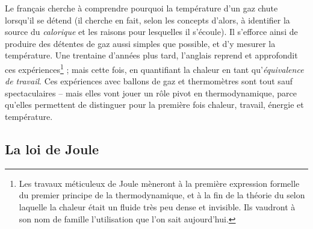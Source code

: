 		
		Le français  cherche à comprendre pourquoi la température d’un gaz chute lorsqu’il se détend (il cherche en fait, selon les concepts d’alors, à identifier la source du \textit{calorique} et les raisons pour lesquelles il s’écoule). Il s’efforce ainsi de produire des détentes de gaz aussi simples que possible, et d’y mesurer la température. Une trentaine d’années plus tard, l’anglais  reprend et approfondit ces expériences\footnote{Les travaux méticuleux de Joule mèneront à la première expression formelle du premier principe de la thermodynamique, et à la fin de la théorie du  selon laquelle la chaleur était un fluide très peu dense et invisible. Ils vaudront à son nom de famille l’utilisation que l’on sait aujourd’hui.} ; mais cette fois, en quantifiant la chaleur en tant qu’\textit{équivalence de travail}. Ces expériences avec ballons de gaz et thermomètres sont tout sauf spectaculaires -- mais elles vont jouer un rôle pivot en thermodynamique, parce qu’elles permettent de distinguer pour la première fois chaleur, travail, énergie et température.

	\subsection{La loi de Joule}
	\label{ch_principe_de_joule}

